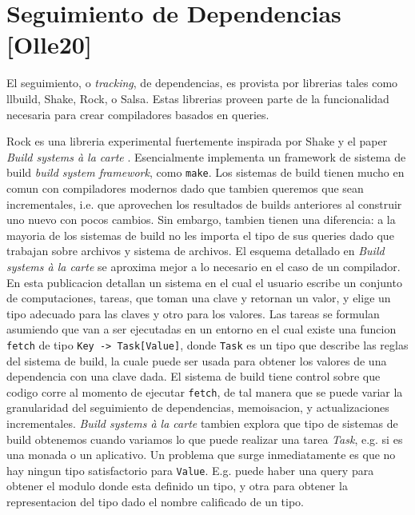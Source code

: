 \documentclass[12pt, a4paper]{report}
\begin{document}
\section*{Seguimiento de Dependencias [Olle20]}

El seguimiento, o \textit{tracking}, de dependencias, es provista por librerias tales como llbuild, Shake, Rock, o Salsa.
Estas librerias proveen parte de la funcionalidad necesaria para crear compiladores basados en queries.

Rock es una libreria experimental fuertemente inspirada por Shake y el paper \textit{Build systems à la carte} \cite{mokhov2018build}.
Esencialmente implementa un framework de sistema de build \textit{build system framework}, como \texttt{make}.
Los sistemas de build tienen mucho en comun con compiladores modernos dado que tambien queremos que sean incrementales, i.e. que aprovechen los resultados de builds anteriores al construir uno nuevo con pocos cambios.
Sin embargo, tambien tienen una diferencia: a la mayoria de los sistemas de build no les importa el tipo de sus queries dado que trabajan sobre archivos y sistema de archivos.
El esquema detallado en \textit{Build systems à la carte} se aproxima mejor a lo necesario en el caso de un compilador.
En esta publicacion detallan un sistema en el cual el usuario escribe un conjunto de computaciones, tareas, que toman una clave y retornan un valor, y elige un tipo adecuado para las claves y otro para los valores.
Las tareas se formulan asumiendo que van a ser ejecutadas en un entorno en el cual existe una funcion \texttt{fetch} de tipo \texttt{Key -> Task[Value]}, donde \texttt{Task} es un tipo que describe las reglas del sistema de build, la cuale puede ser usada para obtener los valores de una dependencia con una clave dada.
El sistema de build tiene control sobre que codigo corre al momento de ejecutar \texttt{fetch}, de tal manera que se puede variar la granularidad del seguimiento de dependencias, memoisacion, y actualizaciones incrementales.
\textit{Build systems à la carte} tambien explora que tipo de sistemas de build obtenemos cuando variamos lo que puede realizar una tarea \textit{Task}, e.g. si es una monada o un aplicativo.
Un problema que surge inmediatamente es que no hay ningun tipo satisfactorio para \texttt{Value}.
E.g. puede haber una query para obtener el modulo donde esta definido un tipo, y otra para obtener la representacion del tipo dado el nombre calificado de un tipo.
\cite{olle_query_based}
\end{document}
